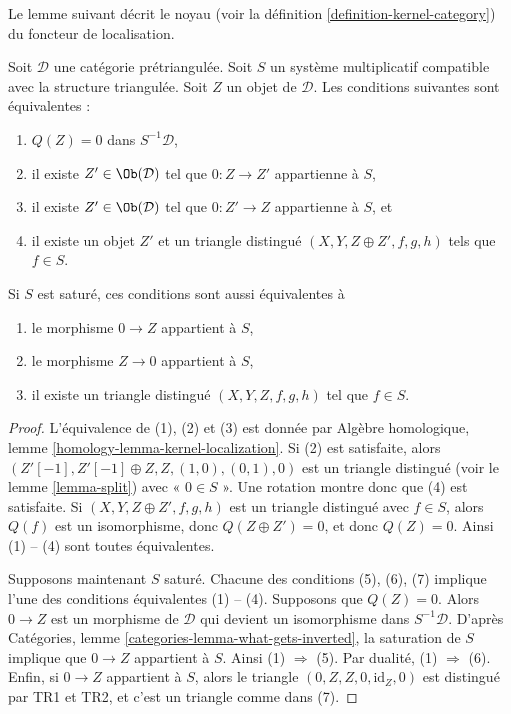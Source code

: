 \noindent
Le lemme suivant décrit le noyau (voir la
définition \ref{definition-kernel-category}) du foncteur de localisation.

\begin{lemma}
\label{lemma-kernel-localization}
Soit $\mathcal{D}$ une catégorie prétriangulée. Soit $S$ un système
multiplicatif compatible avec la structure triangulée. Soit $Z$ un objet de
$\mathcal{D}$. Les conditions suivantes sont équivalentes :
\begin{enumerate}
\item $Q(Z) = 0$ dans $S^{-1}\mathcal{D}$,
\item il existe $Z' \in \Ob(\mathcal{D})$ tel que
$0 : Z \to Z'$ appartienne à $S$,
\item il existe $Z' \in \Ob(\mathcal{D})$ tel que
$0 : Z' \to Z$ appartienne à $S$, et
\item il existe un objet $Z'$ et un triangle distingué
$(X, Y, Z \oplus Z', f, g, h)$ tels que $f \in S$.
\end{enumerate}
Si $S$ est saturé, ces conditions sont aussi équivalentes à
\begin{enumerate}
\item[(5)] le morphisme $0 \to Z$ appartient à $S$,
\item[(6)] le morphisme $Z \to 0$ appartient à $S$,
\item[(7)] il existe un triangle distingué $(X, Y, Z, f, g, h)$ tel que
$f \in S$.
\end{enumerate}
\end{lemma}

\begin{proof}
L'équivalence de (1), (2) et (3) est donnée par Algèbre homologique, lemme
\ref{homology-lemma-kernel-localization}.
Si (2) est satisfaite, alors
$(Z'[-1], Z'[-1] \oplus Z, Z, (1, 0), (0, 1), 0)$ est un triangle distingué
(voir le lemme \ref{lemma-split}) avec « $0 \in S$ ». Une rotation montre donc
que (4) est satisfaite. Si $(X, Y, Z \oplus Z', f, g, h)$ est un triangle
distingué avec $f \in S$, alors $Q(f)$ est un isomorphisme, donc
$Q(Z \oplus Z') = 0$, et donc $Q(Z) = 0$. Ainsi (1) -- (4) sont toutes
équivalentes.

\medskip\noindent
Supposons maintenant $S$ saturé. Chacune des conditions (5), (6), (7) implique
l'une des conditions équivalentes (1) -- (4). Supposons que $Q(Z) = 0$.
Alors $0 \to Z$ est un morphisme de $\mathcal{D}$ qui devient un isomorphisme
dans $S^{-1}\mathcal{D}$. D'après Catégories, lemme
\ref{categories-lemma-what-gets-inverted}, la saturation de $S$ implique que
$0 \to Z$ appartient à $S$. Ainsi (1) $\Rightarrow$ (5). Par dualité,
(1) $\Rightarrow$ (6). Enfin, si $0 \to Z$ appartient à $S$, alors le triangle
$(0, Z, Z, 0, \text{id}_Z, 0)$ est distingué par TR1 et TR2, et c'est un
triangle comme dans (7).
\end{proof}

